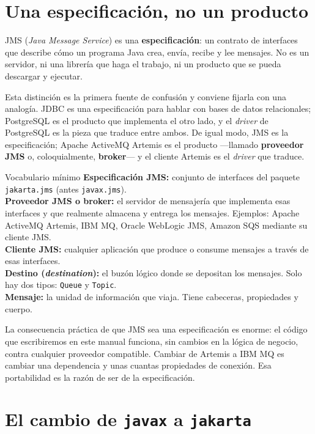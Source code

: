 \documentclass[11pt,a4paper]{book}
\newcommand{\clase}[1]{\texttt{#1}}
\begin{document}
\section{Una especificación, no un producto}

JMS (\emph{Java Message Service}) es una \textbf{especificación}: un contrato de interfaces que describe cómo un programa Java crea, envía, recibe y lee mensajes.
No es un servidor, ni una librería que haga el trabajo, ni un producto que se pueda descargar y ejecutar.

Esta distinción es la primera fuente de confusión y conviene fijarla con una analogía.
JDBC es una especificación para hablar con bases de datos relacionales; PostgreSQL es el producto que implementa el otro lado, y el \emph{driver} de PostgreSQL es la pieza que traduce entre ambos.
De igual modo, JMS es la especificación; Apache ActiveMQ Artemis es el producto ---llamado \textbf{proveedor JMS} o, coloquialmente, \textbf{broker}--- y el cliente Artemis es el \emph{driver} que traduce.

\begin{cajaDef}{Vocabulario mínimo}
	\textbf{Especificación JMS:} conjunto de interfaces del paquete \clase{jakarta.jms} (antes \clase{javax.jms}).\\
	\textbf{Proveedor JMS o broker:} el servidor de mensajería que implementa esas interfaces y que realmente almacena y entrega los mensajes. Ejemplos: Apache ActiveMQ Artemis, IBM MQ, Oracle WebLogic JMS, Amazon SQS mediante su cliente JMS.\\
	\textbf{Cliente JMS:} cualquier aplicación que produce o consume mensajes a través de esas interfaces.\\
	\textbf{Destino (\emph{destination}):} el buzón lógico donde se depositan los mensajes. Solo hay dos tipos: \clase{Queue} y \clase{Topic}.\\
	\textbf{Mensaje:} la unidad de información que viaja. Tiene cabeceras, propiedades y cuerpo.
\end{cajaDef}

La consecuencia práctica de que JMS sea una especificación es enorme: el código que escribiremos en este manual funciona, sin cambios en la lógica de negocio, contra cualquier proveedor compatible.
Cambiar de Artemis a IBM MQ es cambiar una dependencia y unas cuantas propiedades de conexión.
Esa portabilidad es la razón de ser de la especificación.

\section{El cambio de \texttt{javax} a \texttt{jakarta}}
\end{document}
